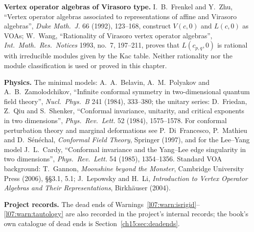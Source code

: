 \textbf{Vertex operator algebras of Virasoro type.} I.~B.~Frenkel and Y.~Zhu, ``Vertex operator algebras associated
to representations of affine and Virasoro algebras'', \emph{Duke Math.\ J.} 66 (1992), 123--168, construct $V(c,0)$
and $L(c,0)$ as VOAs; W.~Wang, ``Rationality of Virasoro vertex operator algebras'', \emph{Int.\ Math.\ Res.\ Notices}
1993, no.~7, 197--211, proves that $L(c_{p,q},0)$ is rational with irreducible modules given by the Kac table. Neither
rationality nor the module classification is used or proved in this chapter.

\textbf{Physics.} The minimal models: A.~A.~Belavin, A.~M.~Polyakov and A.~B.~Zamolodchikov, ``Infinite conformal
symmetry in two-dimensional quantum field theory'', \emph{Nucl.\ Phys.\ B} 241 (1984), 333--380; the unitary series:
D.~Friedan, Z.~Qiu and S.~Shenker, ``Conformal invariance, unitarity, and critical exponents in two dimensions'',
\emph{Phys.\ Rev.\ Lett.} 52 (1984), 1575--1578. For conformal perturbation theory and marginal deformations see
P.~Di~Francesco, P.~Mathieu and D.~S\'en\'echal, \emph{Conformal Field Theory}, Springer (1997), and for the
Lee--Yang model J.~L.~Cardy, ``Conformal invariance and the Yang--Lee edge singularity in two dimensions'',
\emph{Phys.\ Rev.\ Lett.} 54 (1985), 1354--1356. Standard VOA background: T.~Gannon, \emph{Moonshine beyond the Monster},
Cambridge University Press (2006), §§3.1, 5.1; J.~Lepowsky and H.~Li, \emph{Introduction to Vertex Operator Algebras and
Their Representations}, Birkh\"auser (2004).

\textbf{Project records.} The dead ends of Warnings~\ref{l07:warn:isrigid}--\ref{l07:warn:tautology} are also
recorded in the project's internal records; the book's own catalogue of dead ends is Section~\ref{ch15:sec:deadends}.

\endgroup

